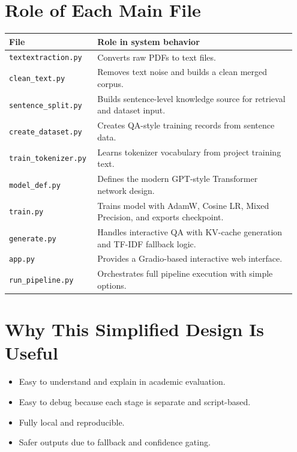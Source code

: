 \documentclass[a4paper,11pt]{article}
\begin{document}
\section{Role of Each Main File}
\begin{longtable}{>{\raggedright\arraybackslash}p{0.28\linewidth} >{\raggedright\arraybackslash}p{0.67\linewidth}}
\toprule
\textbf{File} & \textbf{Role in system behavior} \\
\midrule
\texttt{textextraction.py} & Converts raw PDFs to text files. \\
\texttt{clean\_text.py} & Removes text noise and builds a clean merged corpus. \\
\texttt{sentence\_split.py} & Builds sentence-level knowledge source for retrieval and dataset input. \\
\texttt{create\_dataset.py} & Creates QA-style training records from sentence data. \\
\texttt{train\_tokenizer.py} & Learns tokenizer vocabulary from project training text. \\
\texttt{model\_def.py} & Defines the modern GPT-style Transformer network design. \\
\texttt{train.py} & Trains model with AdamW, Cosine LR, Mixed Precision, and exports checkpoint. \\
\texttt{generate.py} & Handles interactive QA with KV-cache generation and TF-IDF fallback logic. \\
\texttt{app.py} & Provides a Gradio-based interactive web interface. \\
\texttt{run\_pipeline.py} & Orchestrates full pipeline execution with simple options. \\
\bottomrule
\end{longtable}

\section{Why This Simplified Design Is Useful}
\begin{itemize}[leftmargin=1.5em]
    \item Easy to understand and explain in academic evaluation.
    \item Easy to debug because each stage is separate and script-based.
    \item Fully local and reproducible.
    \item Safer outputs due to fallback and confidence gating.
\end{itemize}
\end{document}
